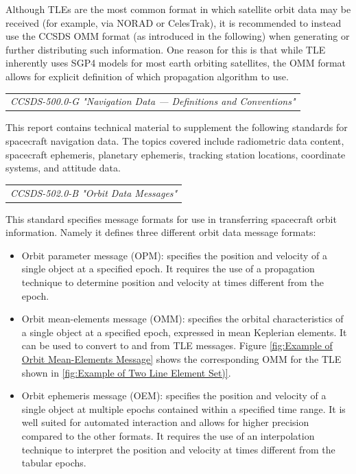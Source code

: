 Although TLEs are the most common format in which satellite orbit data may be received (for example, via NORAD or CelesTrak), it is recommended to instead use the CCSDS OMM format (as introduced in the following) when generating or further distributing such information. One reason for this is that while TLE inherently uses SGP4 models for most earth orbiting satellites, the OMM format allows for explicit definition of which propagation algorithm to use.

\begin{tabular}{l}
\textit{CCSDS-500.0-G "Navigation Data — Definitions and Conventions" \cite{CCSDS-500.0-G}} \\
\end{tabular}

This report contains technical material to supplement the following standards for spacecraft navigation data. The topics covered include radiometric data content, spacecraft ephemeris, planetary ephemeris, tracking station locations, coordinate systems, and attitude data. 

\begin{tabular}{l}
\textit{CCSDS-502.0-B "Orbit Data Messages" \cite{CCSDS-502.0-B}} \\
\end{tabular}

This standard specifies message formats for use in transferring spacecraft orbit information. Namely it defines three different orbit data message formats:

\begin{itemize}
\item Orbit parameter message (OPM): specifies the position and velocity of a single object at a specified epoch. It requires the use of a propagation technique to determine position and velocity at times different from the epoch.
\item Orbit mean-elements message (OMM): specifies the orbital characteristics of a single object at a specified epoch, expressed in mean Keplerian elements. It can be used to convert to and from TLE messages. Figure \ref{fig:Example of Orbit Mean-Elements Message} shows the corresponding OMM for the TLE shown in \ref{fig:Example of Two Line Element Set)}.
\item Orbit ephemeris message (OEM): specifies the position and velocity of a single object at multiple epochs contained within a specified time range. It is well suited for automated interaction and allows for higher precision compared to the other formats. It requires the use of an interpolation technique to interpret the position and velocity at times different from the tabular epochs. 
\end{itemize}


